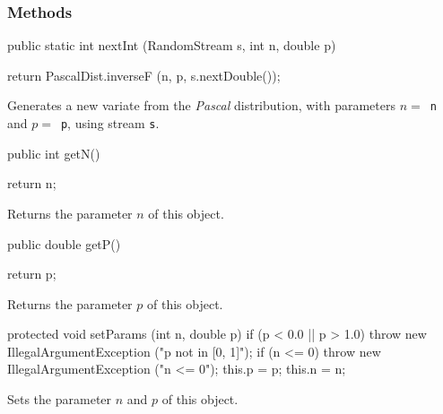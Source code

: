 \subsubsection* {Methods}
\begin{code}
    
   public static int nextInt (RandomStream s, int n, double p)\begin{hide} {
      return PascalDist.inverseF (n, p, s.nextDouble());
   }\end{hide}
\end{code}
\begin{tabb}
 Generates a new variate from the \emph{Pascal} distribution,
 with parameters $n = $~\texttt{n} and $p = $~\texttt{p}, using stream \texttt{s}.
 \end{tabb}
\begin{code}

   public int getN()\begin{hide} {
      return n;
   }
   \end{hide}
\end{code}
\begin{tabb} Returns the parameter $n$ of this object.
\end{tabb}
\begin{code}

   public double getP()\begin{hide} {
      return p;
   }
   \end{hide}
\end{code}
\begin{tabb} Returns the parameter $p$ of this object.
\end{tabb}
\begin{hide}\begin{code}

   protected void setParams (int n, double p) {
      if (p < 0.0 || p > 1.0)
         throw new IllegalArgumentException ("p not in [0, 1]");
      if (n <= 0)
         throw new IllegalArgumentException ("n <= 0");
      this.p = p;
      this.n = n;
   }
\end{code}
\begin{tabb} Sets the parameter $n$ and $p$ of this object.
\end{tabb}
\begin{code}
}\end{code}
\end{hide}
